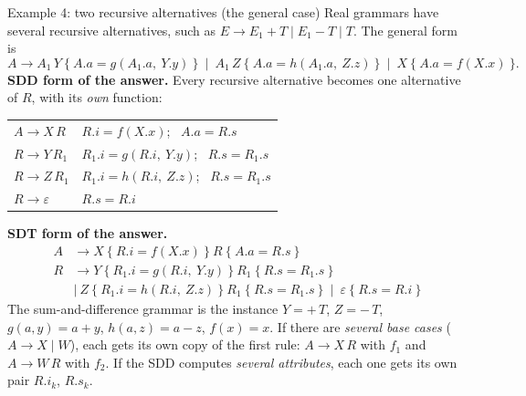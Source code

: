 \documentclass[11pt,a4paper]{article}
\newcommand{\at}[2]{\ensuremath{#1.\mathit{#2}}}
\begin{document}
\begin{examplebox}{Example 4: two recursive alternatives (the general case)}
Real grammars have several recursive alternatives, such as $E\to E_1+T\mid E_1-T\mid T$. The general form is
\[
A \to A_1\,Y\ \{\ \at{A}{a}=g(\at{A_1}{a},\ \at{Y}{y})\ \}\ \mid\ A_1\,Z\ \{\ \at{A}{a}=h(\at{A_1}{a},\ \at{Z}{z})\ \}\ \mid\ X\ \{\ \at{A}{a}=f(\at{X}{x})\ \}.
\]
\textbf{SDD form of the answer.} Every recursive alternative becomes one alternative of $R$, with its \emph{own} function:
\begin{center}
\small
\begin{tabular}{@{}l l@{}}
\toprule
$A \to X\,R$ & $\at{R}{i}=f(\at{X}{x})$; \ $\at{A}{a}=\at{R}{s}$ \\
$R \to Y\,R_1$ & $\at{R_1}{i}=g(\at{R}{i},\ \at{Y}{y})$; \ $\at{R}{s}=\at{R_1}{s}$ \\
$R \to Z\,R_1$ & $\at{R_1}{i}=h(\at{R}{i},\ \at{Z}{z})$; \ $\at{R}{s}=\at{R_1}{s}$ \\
$R \to \varepsilon$ & $\at{R}{s}=\at{R}{i}$ \\ \bottomrule
\end{tabular}
\end{center}
\textbf{SDT form of the answer.}
\begin{align*}
A &\to X\ \{\ \at{R}{i}=f(\at{X}{x})\ \}\ R\ \{\ \at{A}{a}=\at{R}{s}\ \}\\
R &\to Y\ \{\ \at{R_1}{i}=g(\at{R}{i},\ \at{Y}{y})\ \}\ R_1\ \{\ \at{R}{s}=\at{R_1}{s}\ \}\\
  &\mid\ Z\ \{\ \at{R_1}{i}=h(\at{R}{i},\ \at{Z}{z})\ \}\ R_1\ \{\ \at{R}{s}=\at{R_1}{s}\ \}\ \mid\ \varepsilon\ \{\ \at{R}{s}=\at{R}{i}\ \}
\end{align*}
The sum-and-difference grammar is the instance $Y=+\,T$, $Z=-\,T$, $g(a,y)=a+y$, $h(a,z)=a-z$, $f(x)=x$. If there are \emph{several base cases} ($A\to X\mid W$), each gets its own copy of the first rule: $A\to X\,R$ with $f_1$ and $A\to W\,R$ with $f_2$. If the SDD computes \emph{several attributes}, each one gets its own pair $R.i_k$, $R.s_k$.
\end{examplebox}
\end{document}
